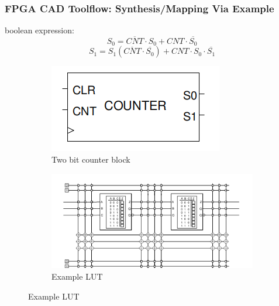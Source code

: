 \documentclass{beamer}
\begin{document}
\begin{frame}[fragile]
  \frametitle{FPGA CAD Toolflow: Synthesis/Mapping Via Example}
  boolean expression:
   \[{S}_0 = \overline{CNT}\cdot{S}_0+ CNT \cdot \overline{{S}_0} \]
   \[{S}_1  ={S}_1 (\overline{CNT} \cdot\overline{{S}_0}) + CNT\cdot{S}_0\cdot\overline{{S}_1} \]
    \begin{figure}[h]
        \begin{subfigure}{.5\textwidth}
            \includegraphics[width=0.9\linewidth]{images/basic_block.png} 
             \caption{Two bit counter block}
             \label{fig:subim1}
        \end{subfigure}
        \begin{subfigure}{.5\textwidth}
             \includegraphics[width=0.9\linewidth]{images/LUT.png}
             \caption{Example LUT }
             \label{fig:subim2}
             \end{subfigure}
    \end{figure}
\end{frame}
\end{document}
